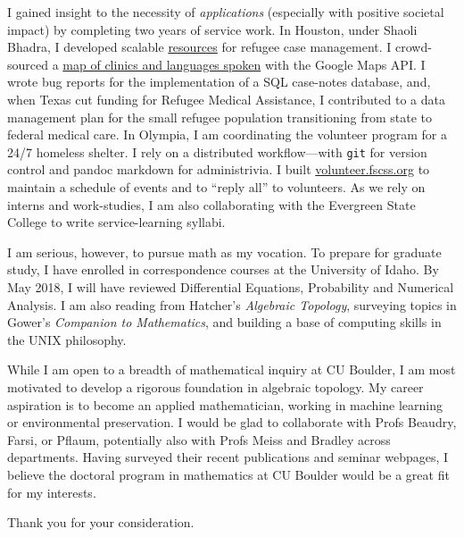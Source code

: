 \documentclass{article}
\begin{document}
I gained insight to the necessity of \emph{applications} (especially with positive societal impact) by completing two years of service work.  In Houston, under Shaoli Bhadra, I developed scalable \href{https://github.com/coltongrainger/ymca-resources}{resources} for refugee case management. I crowd-sourced a \href{https://drive.google.com/open?id=1kk9yn6-4nifHLIf2tGYbW_7PiYo\&usp=sharing}{map of clinics and languages spoken} with the Google Maps API. I wrote bug reports for the implementation of a SQL case-notes database, and, when Texas cut funding for Refugee Medical Assistance, I contributed to a data management plan for the small refugee population transitioning from state to federal medical care. In Olympia, I am coordinating the volunteer program for a 24/7 homeless shelter. I rely on a distributed workflow---with \texttt{git} for version control and pandoc markdown for administrivia. I built \href{http://volunteer.fscss.org}{volunteer.fscss.org} to maintain a schedule of events and to ``reply all'' to volunteers. As we rely on interns and work-studies, I am also collaborating with the Evergreen State College to write service-learning syllabi.

I am serious, however, to pursue math as my vocation. To prepare for graduate study, I have enrolled in correspondence courses at the University of Idaho. By May 2018, I will have reviewed Differential Equations, Probability and Numerical Analysis. I am also reading from Hatcher's \emph{Algebraic Topology}, surveying topics in Gower's \emph{Companion to Mathematics}, and building a base of computing skills in the UNIX philosophy.

While I am open to a breadth of mathematical inquiry at CU Boulder, I am most motivated to develop a rigorous foundation in algebraic topology.  My career aspiration is to become an applied mathematician, working in machine learning or environmental preservation. I would be glad to collaborate with Profs Beaudry, Farsi, or Pflaum, potentially also with Profs Meiss and Bradley across departments. Having surveyed their recent publications and seminar webpages, I believe the doctoral program in mathematics at CU Boulder would be a great fit for my interests.

Thank you for your consideration.
\end{document}
